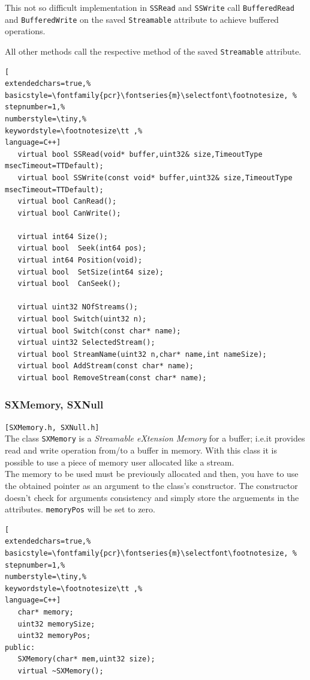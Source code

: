 This not so difficult implementation in \texttt{SSRead} and \texttt{SSWrite} call \texttt{BufferedRead} and \texttt{BufferedWrite} on the saved \texttt{Streamable} attribute to achieve buffered operations.

All other methods call the respective method of the saved \texttt{Streamable} attribute.
\begin{lstlisting}[
extendedchars=true,%
basicstyle=\fontfamily{pcr}\fontseries{m}\selectfont\footnotesize, %
stepnumber=1,%
numberstyle=\tiny,%
keywordstyle=\footnotesize\tt ,%
language=C++]
   virtual bool SSRead(void* buffer,uint32& size,TimeoutType msecTimeout=TTDefault);
   virtual bool SSWrite(const void* buffer,uint32& size,TimeoutType msecTimeout=TTDefault);
   virtual bool CanRead();
   virtual bool CanWrite();

   virtual int64 Size();
   virtual bool  Seek(int64 pos);
   virtual int64 Position(void);
   virtual bool  SetSize(int64 size);
   virtual bool  CanSeek();

   virtual uint32 NOfStreams();
   virtual bool Switch(uint32 n);
   virtual bool Switch(const char* name);
   virtual uint32 SelectedStream();
   virtual bool StreamName(uint32 n,char* name,int nameSize);
   virtual bool AddStream(const char* name);
   virtual bool RemoveStream(const char* name);
\end{lstlisting}



\subsubsection{SXMemory, SXNull}
\texttt{[SXMemory.h, SXNull.h]}\\
The class \texttt{SXMemory} is a \textit{Streamable eXtension Memory} for a buffer; i.e.it provides read and write operation from/to a buffer in memory. With this class it is possible to use a piece of memory user allocated like a stream.\\


The memory to be used must be previously allocated and then, you have to use the obtained pointer as an argument to the class's constructor. The constructor doesn't check for arguments consistency and simply store the arguements in the attributes. \texttt{memoryPos} will be set to zero.
\begin{lstlisting}[
extendedchars=true,%
basicstyle=\fontfamily{pcr}\fontseries{m}\selectfont\footnotesize, %
stepnumber=1,%
numberstyle=\tiny,%
keywordstyle=\footnotesize\tt ,%
language=C++]
   char* memory;
   uint32 memorySize;
   uint32 memoryPos;
public:
   SXMemory(char* mem,uint32 size);
   virtual ~SXMemory();
\end{lstlisting}


